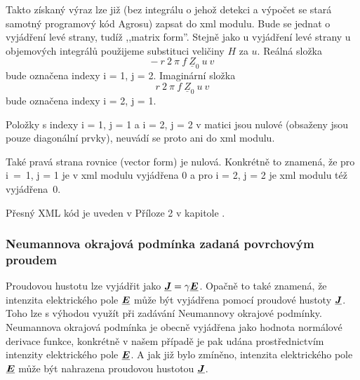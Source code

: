 \documentclass[12pt,a4paper,oneside]{article}
\numberwithin{equation}{section} %
\numberwithin{figure}{section} %
\numberwithin{table}{section} %
\renewcommand{\vec}[1]{\mbox{\boldmath$#1$}} %
\newcommand{\faz}[1]{{\underline{#1}}} %
\begin{document}
Takto získaný výraz lze již (bez integrálu o jehož detekci a výpočet se stará samotný programový kód Agrosu) zapsat do xml modulu. Bude se jednat o vyjádření levé strany, tudíž ,,matrix form''. Stejně jako u vyjádření levé strany u objemových integrálů použijeme substituci veličiny $H$ za $u$. Reálná složka 
\begin{equation}
- ~ r ~ 2 ~ \pi ~ f ~ \faz{Z} _0 ~ u ~ v
\end{equation} 
bude označena indexy i = 1, j = 2. Imaginární složka 
\begin{equation}
r ~ 2 ~ \pi ~ f ~ \faz{Z} _0 ~ u ~ v
\end{equation}
bude označena indexy i = 2, j = 1.

Položky s indexy i = 1, j = 1 a i = 2, j = 2 v matici jsou nulové (obsaženy jsou pouze diagonální prvky), neuvádí se proto ani do xml modulu.

Také pravá strana rovnice (vector form) je nulová. Konkrétně to znamená, že pro i~=~1, j = 1 je v xml modulu vyjádřena $0$ a pro i = 2, j = 2 je xml modulu též vyjádřena~$0$.

Přesný XML kód je uveden v Příloze 2 v kapitole .



\subsubsection{Neumannova okrajová podmínka zadaná povrchovým proudem}
Proudovou hustotu lze vyjádřit jako $\faz{\vec{J}} = \gamma \faz{\vec{E}}$. Opačně to také znamená, že intenzita elektrického pole $\faz{\vec{E}}$ může být vyjádřena pomocí proudové hustoty $\faz{\vec{J}}$. Toho lze s výhodou využít při zadávání Neumannovy okrajové podmínky. Neumannova okrajová podmínka je obecně vyjádřena jako hodnota normálové derivace funkce, konkrétně v našem případě je pak udána prostřednictvím intenzity elektrického pole $\faz{\vec{E}}$. A jak již bylo zmíněno, intenzita elektrického pole $\faz{\vec{E}}$ může být nahrazena proudovou hustotou $\faz{\vec{J}}$.
\end{document}
